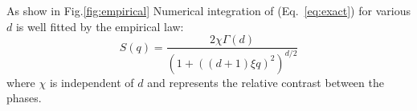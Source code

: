 \documentclass[12pt,a4paper]{article}
\begin{document}
As show in Fig.\ref{fig:empirical} Numerical integration of (Eq.~\ref{eq:exact}) for various $d$ is well fitted by the empirical law:
\begin{equation}
S(q) = \frac{2\chi\Gamma(d)}{\left(1+\left((d+1)\xi q\right)^2\right)^{d/2}}
\end{equation}
where $\chi$ is independent of $d$ and represents the relative contrast between the phases.
\end{document}
